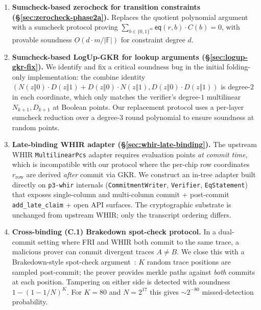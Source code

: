 \begin{enumerate}
  \item \textbf{Sumcheck-based zerocheck for transition constraints
        (\S\ref{sec:zerocheck-phase2a}).}  Replaces the quotient
        polynomial argument with a sumcheck protocol
        proving $\sum_{b \in \{0,1\}^m} \mathsf{eq}(r, b) \cdot
        C(b) = 0$, with provable soundness $O(d \cdot m / |\mathbb{F}|)$
        for constraint degree $d$.

  \item \textbf{Sumcheck-based LogUp-GKR for lookup
        arguments (\S\ref{sec:logup-gkr-fix}).}  We identify and
        fix a critical soundness bug in the initial folding-only
        implementation: the combine identity
        $(N(z\Vert 0)\cdot D(z\Vert 1) + D(z\Vert 0) \cdot
         N(z\Vert 1), D(z\Vert 0) \cdot D(z\Vert 1))$
        is degree-$2$ in each coordinate, which only matches the
        verifier's degree-$1$ multilinear $N_{k+1}, D_{k+1}$ at
        Boolean points.  Our replacement protocol uses a per-layer
        sumcheck reduction over a degree-$3$ round polynomial to
        ensure soundness at random points.

  \item \textbf{Late-binding WHIR adapter
        (\S\ref{sec:whir-late-binding}).}  The upstream WHIR
        \texttt{MultilinearPcs} adapter requires evaluation points
        \emph{at commit time}, which is incompatible with our
        protocol where the per-chip row coordinates
        $r_{\mathrm{row}}$ are derived \emph{after} commit via GKR.
        We construct an in-tree adapter built directly on
        \texttt{p3-whir} internals (\texttt{CommitmentWriter},
        \texttt{Verifier}, \texttt{EqStatement}) that exposes
        single-column and multi-column commit + post-commit
        \texttt{add\_late\_claim} + open API surfaces.  The
        cryptographic substrate is unchanged from upstream WHIR;
        only the transcript ordering differs.

  \item \textbf{Cross-binding (C.1) Brakedown spot-check
        protocol.}  In a dual-commit setting where FRI and WHIR
        both commit to the same trace, a malicious prover can
        commit divergent traces $A \neq B$.  We close this with a
        Brakedown-style spot-check argument~\cite{brakedown}: $K$
        random trace positions are sampled post-commit; the prover
        provides merkle paths against \emph{both} commits at each
        position.  Tampering on either side is detected with
        soundness $1 - (1 - 1/N)^K$.  For $K = 80$ and $N = 2^{17}$
        this gives $\sim 2^{-80}$ missed-detection probability.


\end{enumerate}
